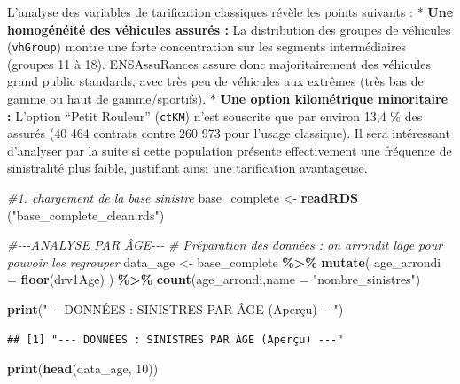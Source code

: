 \documentclass[
]{article}
\newenvironment{Shaded}{\begin{snugshade}}{\end{snugshade}}
\newcommand{\AttributeTok}[1]{\textcolor[rgb]{0.13,0.29,0.53}{#1}}
\newcommand{\CommentTok}[1]{\textcolor[rgb]{0.56,0.35,0.01}{\textit{#1}}}
\newcommand{\DecValTok}[1]{\textcolor[rgb]{0.00,0.00,0.81}{#1}}
\newcommand{\FunctionTok}[1]{\textcolor[rgb]{0.13,0.29,0.53}{\textbf{#1}}}
\newcommand{\NormalTok}[1]{#1}
\newcommand{\OtherTok}[1]{\textcolor[rgb]{0.56,0.35,0.01}{#1}}
\newcommand{\SpecialCharTok}[1]{\textcolor[rgb]{0.81,0.36,0.00}{\textbf{#1}}}
\newcommand{\StringTok}[1]{\textcolor[rgb]{0.31,0.60,0.02}{#1}}
\begin{document}
L'analyse des variables de tarification classiques révèle les points
suivants : * \textbf{Une homogénéité des véhicules assurés :} La
distribution des groupes de véhicules (\texttt{vhGroup}) montre une
forte concentration sur les segments intermédiaires (groupes 11 à 18).
ENSAssuRances assure donc majoritairement des véhicules grand public
standards, avec très peu de véhicules aux extrêmes (très bas de gamme ou
haut de gamme/sportifs). * \textbf{Une option kilométrique minoritaire
:} L'option ``Petit Rouleur'' (\texttt{ctKM}) n'est souscrite que par
environ 13,4 \% des assurés (40 464 contrats contre 260 973 pour l'usage
classique). Il sera intéressant d'analyser par la suite si cette
population présente effectivement une fréquence de sinistralité plus
faible, justifiant ainsi une tarification avantageuse.

\begin{Shaded}
\begin{Highlighting}[]
\CommentTok{\#1. chargement de la base sinistre }
\NormalTok{base\_complete }\OtherTok{\textless{}{-}} \FunctionTok{readRDS}\NormalTok{ (}\StringTok{"base\_complete\_clean.rds"}\NormalTok{)}
\end{Highlighting}
\end{Shaded}

\begin{Shaded}
\begin{Highlighting}[]
\CommentTok{\#{-}{-}{-}ANALYSE PAR ÂGE{-}{-}{-}}
\CommentTok{\# Préparation des données : on arrondit l\textquotesingle{}âge pour pouvoir les regrouper}
\NormalTok{data\_age }\OtherTok{\textless{}{-}}\NormalTok{ base\_complete }\SpecialCharTok{\%\textgreater{}\%}
  \FunctionTok{mutate}\NormalTok{(}
    \AttributeTok{age\_arrondi =} \FunctionTok{floor}\NormalTok{(drv1Age)}
\NormalTok{  ) }\SpecialCharTok{\%\textgreater{}\%} \FunctionTok{count}\NormalTok{(age\_arrondi,}\AttributeTok{name =} \StringTok{"nombre\_sinistres"}\NormalTok{)}

\FunctionTok{print}\NormalTok{(}\StringTok{"{-}{-}{-} DONNÉES : SINISTRES PAR ÂGE (Aperçu) {-}{-}{-}"}\NormalTok{)}
\end{Highlighting}
\end{Shaded}

\begin{verbatim}
## [1] "--- DONNÉES : SINISTRES PAR ÂGE (Aperçu) ---"
\end{verbatim}

\begin{Shaded}
\begin{Highlighting}[]
\FunctionTok{print}\NormalTok{(}\FunctionTok{head}\NormalTok{(data\_age, }\DecValTok{10}\NormalTok{))}
\end{Highlighting}
\end{Shaded}
\end{document}
